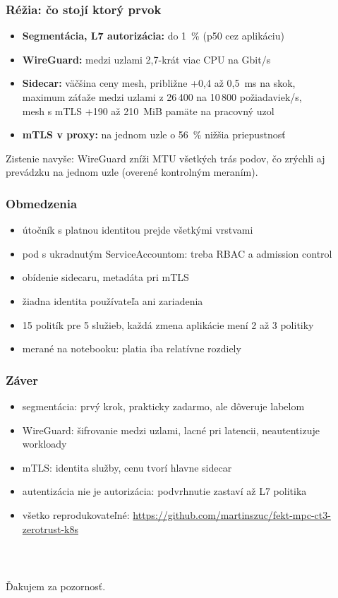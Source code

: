 \documentclass[%
  12pt,       				%
	t,                  %
	aspectratio=1610,   %
	unicode,						%
]{beamer}				    	%
\begin{document}
\begin{frame}
  \frametitle{Réžia: čo stojí ktorý prvok}
  \begin{itemize}
    \item \textbf{Segmentácia, L7 autorizácia:} do 1~\% (p50 cez aplikáciu)
    \item \textbf{WireGuard:} medzi uzlami 2,7-krát viac CPU na Gbit/s
    \item \textbf{Sidecar:} väčšina ceny mesh, približne +0,4 až 0,5~ms na skok,\\ maximum záťaže medzi uzlami z 26\,400 na 10\,800 požiadaviek/s,\\ mesh s mTLS +190 až 210~MiB pamäte na pracovný uzol
    \item \textbf{mTLS v proxy:} na jednom uzle o 56~\% nižšia priepustnosť
  \end{itemize}
  \vspace{0.5em}
  \small Zistenie navyše: WireGuard zníži MTU všetkých trás podov, čo zrýchli aj prevádzku na jednom uzle (overené kontrolným meraním).
\end{frame}

\begin{frame}
  \frametitle{Obmedzenia}
  \begin{itemize}
    \item útočník s platnou identitou prejde všetkými vrstvami
    \item pod s ukradnutým ServiceAccountom: treba RBAC a admission control
    \item obídenie sidecaru, metadáta pri mTLS
    \item žiadna identita používateľa ani zariadenia
    \item 15 politík pre 5 služieb, každá zmena aplikácie mení 2 až 3 politiky
    \item merané na notebooku: platia iba relatívne rozdiely
  \end{itemize}
\end{frame}

\begin{frame}
  \frametitle{Záver}
  \begin{itemize}
    \item segmentácia: prvý krok, prakticky zadarmo, ale dôveruje labelom
    \item WireGuard: šifrovanie medzi uzlami, lacné pri latencii, neautentizuje workloady
    \item mTLS: identita služby, cenu tvorí hlavne sidecar
    \item autentizácia nie je autorizácia: podvrhnutie zastaví až L7 politika
    \item všetko reprodukovateľné: \url{https://github.com/martinszuc/fekt-mpc-ct3-zerotrust-k8s}
  \end{itemize}
\end{frame}

\begin{frame}[c]
  \frametitle{\mbox{ }}
  \begin{center}
    {\Huge Ďakujem za pozornosť.}
  \end{center}
\end{frame}
\end{document}
